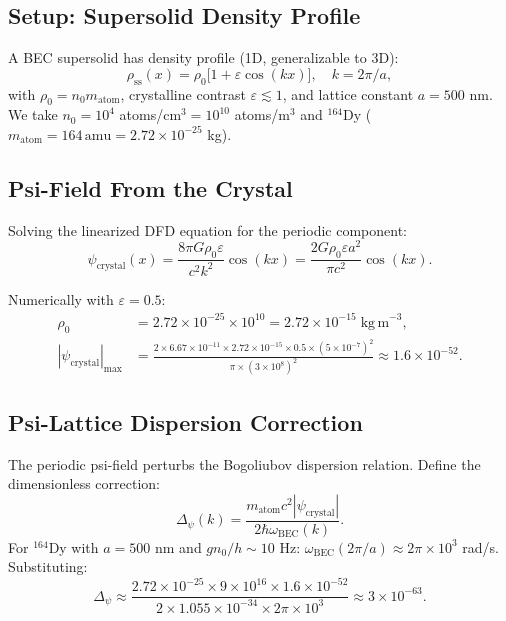 \documentclass[11pt]{article}
\theoremstyle{definition}
\theoremstyle{remark}
\begin{document}
\subsection{Setup: Supersolid Density Profile}

A BEC supersolid has density profile (1D, generalizable to 3D):
\begin{equation}
  \rho_{\mathrm{ss}}(x) = \rho_0\bigl[1 + \varepsilon\cos(kx)\bigr],
  \quad k = 2\pi/a, \label{eq:ss-density}
\end{equation}
with $\rho_0 = n_0 m_{\mathrm{atom}}$, crystalline contrast $\varepsilon \lesssim 1$,
and lattice constant $a = 500$ nm.  We take $n_0 = 10^4$ atoms/cm$^3 = 10^{10}$
atoms/m$^3$ and $^{164}$Dy ($m_{\mathrm{atom}} = 164\,\mathrm{amu}
= 2.72\times10^{-25}$ kg).

\subsection{Psi-Field From the Crystal}

Solving the linearized DFD equation for the periodic component:
\begin{equation}
  \psi_{\mathrm{crystal}}(x) = \frac{8\pi G\rho_0\varepsilon}{c^2 k^2}\cos(kx)
  = \frac{2G\rho_0\varepsilon a^2}{\pi c^2}\cos(kx). \label{eq:psi-crystal}
\end{equation}

Numerically with $\varepsilon = 0.5$:
\begin{align}
  \rho_0 &= 2.72\times10^{-25}\times10^{10} = 2.72\times10^{-15}\;\mathrm{kg\,m}^{-3}, \\
  |\psi_{\mathrm{crystal}}|_{\max} &= \frac{2\times6.67\times10^{-11}
    \times2.72\times10^{-15}\times0.5\times(5\times10^{-7})^2}{\pi\times(3\times10^8)^2}
  \approx 1.6\times10^{-52}. \label{eq:psi-crystal-value}
\end{align}

\subsection{Psi-Lattice Dispersion Correction}

The periodic psi-field perturbs the Bogoliubov dispersion relation.  Define the
dimensionless correction:
\begin{equation}
  \Delta_\psi(k) = \frac{m_{\mathrm{atom}}c^2|\psi_{\mathrm{crystal}}|}{2\hbar\omega_{\mathrm{BEC}}(k)}.
\end{equation}
For $^{164}$Dy with $a = 500$ nm and $gn_0/h \sim 10$ Hz:
$\omega_{\mathrm{BEC}}(2\pi/a) \approx 2\pi\times10^3$ rad/s.  Substituting:
\begin{equation}
  \Delta_\psi \approx \frac{2.72\times10^{-25}\times9\times10^{16}
  \times1.6\times10^{-52}}{2\times1.055\times10^{-34}\times2\pi\times10^3}
  \approx 3\times10^{-63}. \label{eq:delta-psi-value}
\end{equation}
\end{document}
